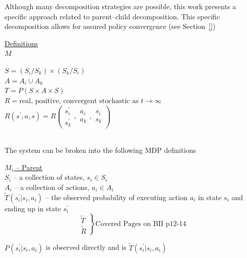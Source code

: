 \newpage


Although many decomposition strategies are possible, this work presents a specific approach related to parent--child decomposition. This specific decomposition allows for assured policy convergence (see Section~\ref{})

\underline{Definitions}\\

\underline{$M$}\quad
\begin{minipage}[t]{5in}
$S=(S_i/S_k)\times(S_k/S_i)$\\
$A=A_i\cup A_k$\\
$T=P(S\times A\times S)$\\
$R= \text{real, positive, convergent stochastic as $t\to\infty$}$\\
$R(s^\prime,a,s) =R\left( 
\begin{array}{c} s^\prime_i \\ s^\prime_k \end{array},
\begin{array}{c} a_i \\ a_k \end{array},
\begin{array}{c} s_i \\ s_k \end{array}
\right)$
\end{minipage}\\

The system can be broken into the following MDP definitions

\underline{$M_i$ -- Parent}\\

$S_i$ -- a collection of states, $s_i\in S_i$\\
$A_i$ -- a collection of actions, $a_i \in A_i$\\
$\tilde{T}( s^\prime_i | s_i, a_i )$ -- the observed probability of executing action $a_i$ in state $s_i$ and ending up in state $s^\prime_i$\\

\begin{equation*}
\left. \begin{array}{l}
\tilde{T}\\
\tilde{R}
\end{array}\right\}
\text{Covered Pages on BII p12-14}
\end{equation*}

$P(s^\prime_i|s_i, a_i)$ is observed directly and is $\tilde{T}( s^\prime_i | s_i, a_i )$\\

